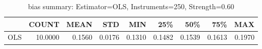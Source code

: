 \begin{table}[ht]
\centering
\caption{bias summary: Estimator=OLS, Instruments=250, Strength=0.60}
\begin{tabular}{lrrrrrrrr}
\toprule
 & COUNT & MEAN & STD & MIN & 25\% & 50\% & 75\% & MAX \\
\midrule
OLS & 10.0000 & 0.1560 & 0.0176 & 0.1310 & 0.1482 & 0.1539 & 0.1613 & 0.1970 \\
\bottomrule
\end{tabular}
\end{table}
